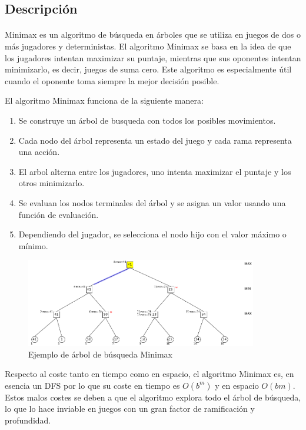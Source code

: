 \documentclass{report}
\begin{document}
        \subsection*{Descripción}
          \paragraph*{}{
            Minimax es un algoritmo de búsqueda en árboles que se utiliza en juegos de dos o más jugadores y deterministas.
            El algoritmo Minimax se basa en la idea de que los jugadores intentan maximizar su puntaje, mientras que sus oponentes intentan minimizarlo, es decir, juegos de suma cero.
            Este algoritmo es especialmente útil cuando el oponente toma siempre la mejor decisión posible.

            El algoritmo Minimax funciona de la siguiente manera:
            \begin{enumerate}
                \item Se construye un árbol de busqueda con todos los posibles movimientos.
                \item Cada nodo del árbol representa un estado del juego y cada rama representa una acción.
                \item El arbol alterna entre los jugadores, uno intenta maximizar el puntaje y los otros minimizarlo.
                \item Se evaluan los nodos terminales del árbol y se asigna un valor usando una función de evaluación.
                \item Dependiendo del jugador, se selecciona el nodo hijo con el valor máximo o mínimo.
            \end{enumerate}
            \begin{figure}[H]
                \centering
                \includegraphics[width=0.9\textwidth]{./.img/minimax.png}
                \caption{Ejemplo de árbol de búsqueda Minimax}
            \end{figure}
            
            Respecto al coste tanto en tiempo como en espacio, el algoritmo Minimax es, en esencia un DFS por lo que su coste en tiempo es $O(b^m)$ y en espacio $O(bm)$. 
            Estos malos costes se deben a que el algoritmo explora todo el árbol de búsqueda, lo que lo hace inviable en juegos con un gran factor de ramificación y profundidad.
          }
\end{document}
